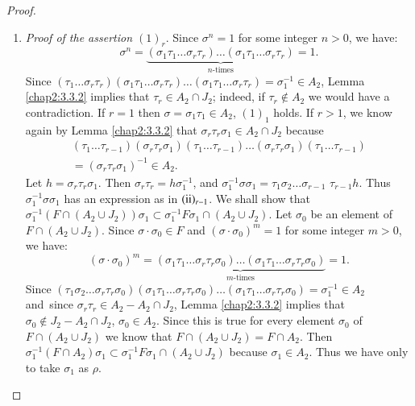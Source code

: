 \begin{proof}
\begin{enumerate}
\item {\em Proof of the assertion $(1)_{r}$}. Since $\sigma^{n}=1$ for
  some integer $n>0$, we have:
$$
\sigma^{n}=\underbrace{(\sigma_{1}\tau_{1}\ldots\sigma_{r}\tau_{r})\ldots(\sigma_{1}\tau_{1}\ldots\sigma_{r}\tau_{r})}_{n\text{-times}}=1.
$$
Since
$(\tau_{1}\ldots\sigma_{r}\tau_{r})(\sigma_{1}\tau_{1}\ldots\sigma_{r}\tau_{r})\ldots(\sigma_{1}\tau_{1}\ldots\sigma_{r}\tau_{r})=\sigma^{-1}_{1}\in
A_{2}$, Lemma \ref{chap2:3.3.2} implies that $\tau_{r}\in A_{2}\cap
J_{2}$; indeed, if $\tau_{r}\not\in A_{2}$ we would have a
contradiction. If $r=1$ then $\sigma=\sigma_{1}\tau_{1}\in A_{2}$,
\iec $(1)_{1}$ holds. If $r>1$, we know again by Lemma \ref{chap2:3.3.2}
that $\sigma_{r}\tau_{r}\sigma_{1}\in A_{2}\cap J_{2}$ because 
\begin{multline*}
  (\tau_{1}\ldots\tau_{r-1}) (\sigma_{r}\tau_{r}\sigma_{1})
  (\tau_{1}\ldots\tau_{r-1})\ldots (\sigma_{r}\tau_{r}\sigma_{1})
  (\tau_{1}\ldots\tau_{r-1})\\ 
  = (\sigma_{r}\tau_{r}\sigma_{1})^{-1}\in A_{2}. 
\end{multline*}
Let $h=\sigma_{r}\tau_{r}\sigma_{1}$. Then
$\sigma_{r}\tau_{r}=h\sigma^{-1}_{1}$, and
$\sigma^{-1}_{1}\sigma\sigma_{1}=\tau_{1} \sigma_{2} \ldots
\sigma_{r-1}$ $\tau_{r-1}h$. Thus
$\sigma^{-1}_{1}\sigma\sigma_{1}$ has an expression as in $({\rm
  ii})_{r-1}$. We shall show that $\sigma^{-1}_{1}(F\cap (A_{2}\cup
J_{2}))\sigma_{1}\subset \sigma^{-1}_{1}F\sigma_{1}\cap (A_{2}\cup
J_{2})$. Let $\sigma_{0}$ be an element of $F\cap (A_{2}\cup
J_{2})$. Since $\sigma\cdot \sigma_{0}\in F$ and $(\sigma\cdot
\sigma_{0})^{m}=1$ for some integer $m>0$, we have:
$$
(\sigma\cdot
\sigma_{0})^{m}=\underbrace{(\sigma_{1}\tau_{1}\ldots\sigma_{r}\tau_{r}\sigma_{0})\ldots(\sigma_{1}\tau_{1}\ldots\sigma_{r}\tau_{r}\sigma_{0})}_{m\text{-times}}=1. 
$$
Since
$(\tau_{1}\sigma_{2}\ldots\sigma_{r}\tau_{r}\sigma_{0})(\sigma_{1}\tau_{1}\ldots\sigma_{r}\tau_{r}\sigma_{0})\ldots(\sigma_{1}\tau_{1}\ldots\sigma_{r}\tau_{r}\sigma_{0})=\sigma^{-1}_{1}\in
A_{2}$ and\pageoriginale\ since $\sigma_{r}\tau_{r}\in A_{2}-A_{2}\cap
J_{2}$, Lemma \ref{chap2:3.3.2} implies that $\sigma_{0}\not\in
J_{2}-A_{2}\cap J_{2}$, \iec $\sigma_{0}\in A_{2}$. Since this is true
for every element $\sigma_{0}$ of $F\cap (A_{2}\cup J_{2})$ we know
that $F\cap (A_{2}\cup J_{2})=F\cap A_{2}$. Then
$\sigma^{-1}_{1}(F\cap A_{2})\sigma_{1}\subset
\sigma^{-1}_{1}F\sigma_{1}\cap (A_{2}\cup J_{2})$ because
$\sigma_{1}\in A_{2}$. Thus we have only to take $\sigma_{1}$ as
$\rho$.


\end{enumerate}
\end{proof}
